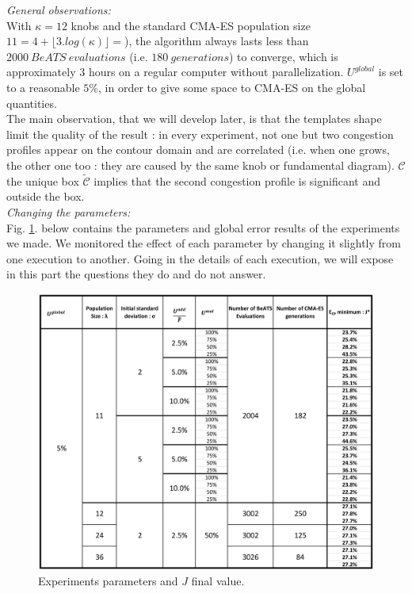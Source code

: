 \emph{General observations:}\\
With $\kappa=12$ knobs and the standard CMA-ES population size $11=4+\lfloor3.log(\kappa)\rfloor=$), the algorithm always lasts less than $2000\ BeATS\ evaluations$ (i.e. $180\ generations$) to converge, which is  approximately 3 hours on a regular computer without parallelization.
$U^{global}$ is set to a reasonable $5\%$, in order to give some space to CMA-ES on the global quantities.\\
The main observation, that we will develop later, is that the templates shape limit the quality of the result : in every experiment, not one but two congestion profiles appear on the contour domain and are correlated (i.e. when one grows, the other one too : they are caused by the same knob or fundamental diagram).  $\mathscr{C}$ the unique box $\widetilde{\mathscr{C}}$ implies that the second congestion profile is significant and outside the box.\\
\emph{Changing the parameters:}\\
Fig. \ref{fig:results_array}. below contains the parameters and global error results of the experiments we made. We monitored the effect of each parameter by changing it slightly from one execution to another. Going in the details of each execution, we will expose in this part the questions they do and do not answer.\\
\begin{figure}
\centering
	\label{fig:results_array}
	\caption{Experiments parameters and $J$ final value.}
	\includegraphics[width=7in]{figures/results_array.png}
\end{figure}




